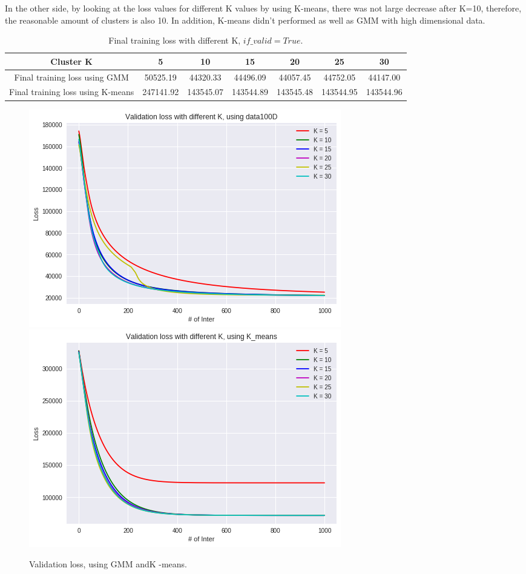\documentclass[10pt,letterpaper]{article}
\begin{document}
In the other side, by looking at the loss values for different K values by using K-means, there was not large decrease after K=10, therefore, the reasonable amount of clusters is also 10. In addition, K-means didn't performed as well as GMM with high dimensional data.\\

\begin{table}[H]
\centering
{\small

\begin{tabular}{ccccccc}
\hline
Cluster K  & 5  & 10 & 15 & 20 & 25 & 30 \\ \hline
Final training loss using GMM & 50525.19  & 44320.33 & 44496.09 & 44057.45 & 44752.05 & 44147.00 \\
Final training loss using K-means & 247141.92  & 143545.07 & 143544.89 & 143545.48 & 143544.95 & 143544.96 \\\hline
\end{tabular}
}
\vspace{-0.2cm}
\caption{Final training loss with different K, $if\_valid = True$.}
\label{tab:Number of hidden units}
\vspace{-0.4cm}
\end{table}



\begin{figure}[H]
\centering

  \includegraphics[width=.45\linewidth]{imgs/p2_2_3loss.png}
  \includegraphics[width=.45\linewidth]{imgs/p2_2_3lossk.png}
  \caption{Validation loss, using GMM andK -means. }

\end{figure}
\end{document}

